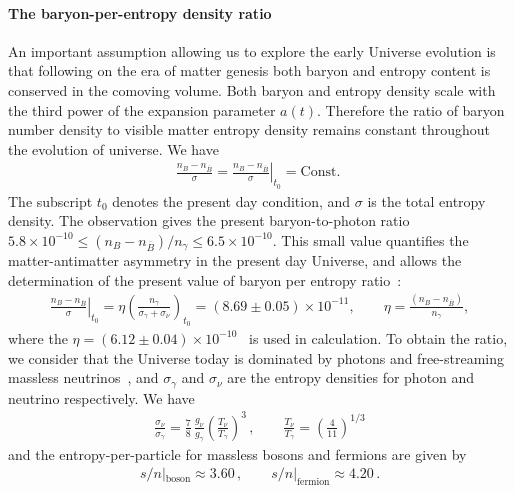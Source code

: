 \paragraph{The baryon-per-entropy density ratio}
An important assumption allowing us to explore the early Universe evolution is that following on the era of matter genesis both baryon and entropy content is conserved in the comoving volume. Both baryon and entropy density scale with the third power of the expansion parameter $a(t)$. Therefore the ratio of baryon number density to visible matter entropy density remains constant throughout the evolution of universe. We have 
\begin{align}
\frac{n_B-n_{\overline{B}}}{\sigma}= \left.\frac{n_B-n_{\overline{B}}}{ \sigma}\right|_{t_0}=\mathrm{Const.}\;
\end{align}
The subscript $t_0$ denotes the present day condition, and $\sigma$ is the total entropy density.
The observation gives the present baryon-to-photon ratio ~\cite{ParticleDataGroup:2022pth} $5.8 \times 10^{-10} \leqslant(n_B-n_{\overline{B}})/n_\gamma\leqslant6.5\times10^{-10}$. This small value quantifies the matter-antimatter asymmetry in the present day Universe, and allows the determination of the present value of baryon per entropy ratio~\cite{Rafelski:2019twp,Fromerth:2002wb,Fromerth:2012fe}:
\begin{align}\label{BaryonEntropyRatio}
\left.\frac{n_B-n_{\overline{B}}}{ \sigma}\right|_{t_0}=\eta\left(\frac{n_\gamma}{\sigma_\gamma+\sigma_\nu}\right)_{\!t_0}\!\!\!\!=(8.69\pm0.05)\!\!\times\!\!10^{-11},\qquad \eta=\frac{(n_B-n_{\overline{B}})}{n_\gamma},
\end{align}
where the $\eta=(6.12\pm0.04)\times10^{-10}$~\cite{ParticleDataGroup:2022pth} is used in calculation. To obtain the ratio, we consider that the Universe today is dominated by photons and free-streaming massless neutrinos~\cite{Birrell:2012gg}, and $\sigma_\gamma$ and $\sigma_\nu$ are the entropy densities for photon and neutrino respectively. We have
\begin{align}
    \frac{\sigma_\nu}{\sigma_\gamma}=\frac{7}{8}\,\frac{g_\nu}{g_\gamma}\left(\frac{T_\nu}{T_\gamma}\right)^3\,,\qquad\frac{T_\nu}{T_\gamma}=\left(\frac{4}{11}\right)^{1/3}
\end{align}
and the entropy-per-particle for massless bosons and fermions are given by~\cite{Fromerth:2012fe}
\begin{align}
s/n|_\mathrm{boson}\approx 3.60\,,\qquad
s/n|_\mathrm{fermion}\approx 4.20\,.
\end{align}
